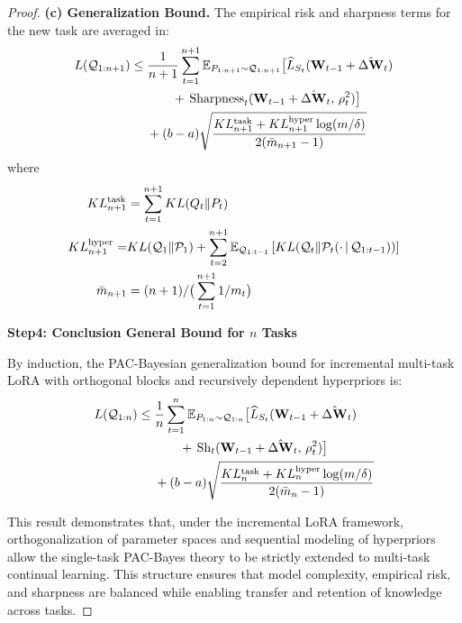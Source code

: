 \documentclass[letterpaper]{article} %
\begin{document}
\begin{proof}
\textbf{(c) Generalization Bound.}
    The empirical risk and sharpness terms for the new task are averaged in:
    \begin{align}
        L(\mathcal{Q}_{1:n+1}) \leq\; & \frac{1}{n+1} \sum_{t=1}^{n+1}
        \mathbb{E}_{P_{1:n+1} \sim \mathcal{Q}_{1:n+1}}\big[
            \widehat{L}_{S_t}(\mathbf{W}_{t-1} + \hat{\Delta\mathbf{W}}_t) \notag\\
        &\qquad +\, \mathrm{Sharpness}_t(\mathbf{W}_{t-1} + \hat{\Delta\mathbf{W}}_t,\, \rho_t^2)
        \big] \notag\\
        & + (b-a)\sqrt{
            \frac{KL_{n+1}^{\text{task}} + KL_{n+1}^{\text{hyper}} \log(m/\delta)}{2(\bar{m}_{n+1} - 1)}
        }
    \end{align}
    where
    \begin{equation}
        \begin{aligned}
        KL_{n+1}^{\text{task}} &= \sum_{t=1}^{n+1} KL(Q_t\|P_t)\\
        KL_{n+1}^{\text{hyper}} = & KL(\mathcal{Q}_1\|\mathcal{P}_1)  +\sum_{t=2}^{n+1} \mathbb{E}_{\mathcal{Q}_{1:t-1}}
        \left[ KL(\mathcal{Q}_t \| \mathcal{P}_t(\cdot\,|\,\mathcal{Q}_{1:t-1})) \right] \\
        \bar{m}_{n+1} &= (n+1)/\big(\sum_{t=1}^{n+1} 1/m_t\big) \notag
    \end{aligned}
    \end{equation}

\textbf{Step4: Conclusion General Bound for $n$ Tasks}

By induction, the PAC-Bayesian generalization bound for incremental multi-task LoRA with orthogonal blocks and recursively dependent hyperpriors is:
\begin{align}
        L(\mathcal{Q}_{1:n}) \leq\; & \frac{1}{n} \sum_{t=1}^{n}
        \mathbb{E}_{P_{1:n} \sim \mathcal{Q}_{1:n}}\big[
            \widehat{L}_{S_t}(\mathbf{W}_{t-1} + \hat{\Delta\mathbf{W}}_t) \notag\\
        &\qquad +\, \mathrm{Sh}_t(\mathbf{W}_{t-1} + \hat{\Delta\mathbf{W}}_t,\, \rho_t^2)
        \big] \notag\\
        & + (b-a)\sqrt{
            \frac{KL_{n}^{\text{task}} + KL_{n}^{\text{hyper}} \log(m/\delta)}{2(\bar{m}_{n} - 1)}
        }
    \end{align}


 This result demonstrates that, under the incremental LoRA framework, orthogonalization of parameter spaces and sequential modeling of hyperpriors allow the single-task PAC-Bayes theory to be strictly extended to multi-task continual learning. This structure ensures that model complexity, empirical risk, and sharpness are balanced while enabling transfer and retention of knowledge across tasks.




\end{proof}
\end{document}
